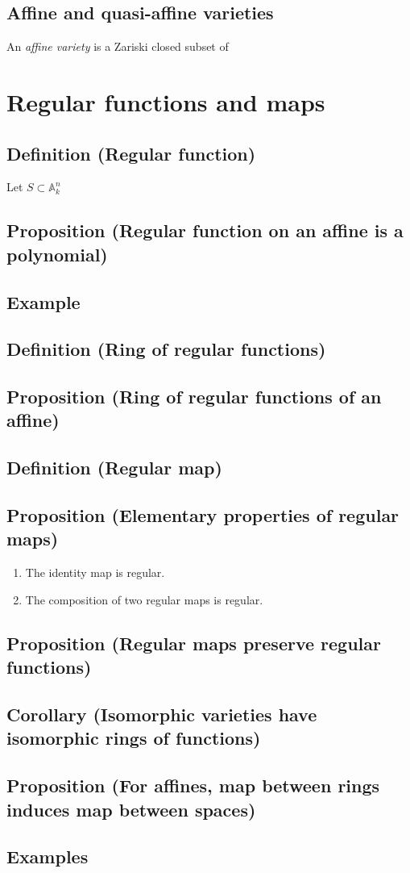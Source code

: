 \documentclass[11pt]{article}
\begin{document}
\subsection{Affine and quasi-affine varieties}
\label{sec:orge9c0d4f}
An \emph{affine variety} is a Zariski closed subset of 
\section{Regular functions and maps}
\label{sec:org2c06819}
\subsection{Definition (Regular function)}
\label{sec:orgb8c62dd}
Let \(S \subset \mathbb A^n_k\)
\subsection{Proposition (Regular function on an affine is a polynomial)}
\label{sec:org7326413}
\subsection{Example}
\label{sec:orgb5bc1ce}
\subsection{Definition (Ring of regular functions)}
\label{sec:orgabf891b}
\subsection{Proposition (Ring of regular functions of an affine)}
\label{sec:org28a4e80}
\subsection{Definition (Regular map)}
\label{sec:orgc84a425}
\subsection{Proposition (Elementary properties of regular maps)}
\label{sec:orgadffd22}
\begin{enumerate}
\item The identity map is regular.
\item The composition of two regular maps is regular.
\end{enumerate}
\subsection{Proposition (Regular maps preserve regular functions)}
\label{sec:org1a42d66}
\subsection{Corollary (Isomorphic varieties have isomorphic rings of functions)}
\label{sec:org4541dbc}
\subsection{Proposition (For affines, map between rings induces map between spaces)}
\label{sec:org75326ff}
\subsection{Examples}
\label{sec:org8cbffac}
\end{document}
